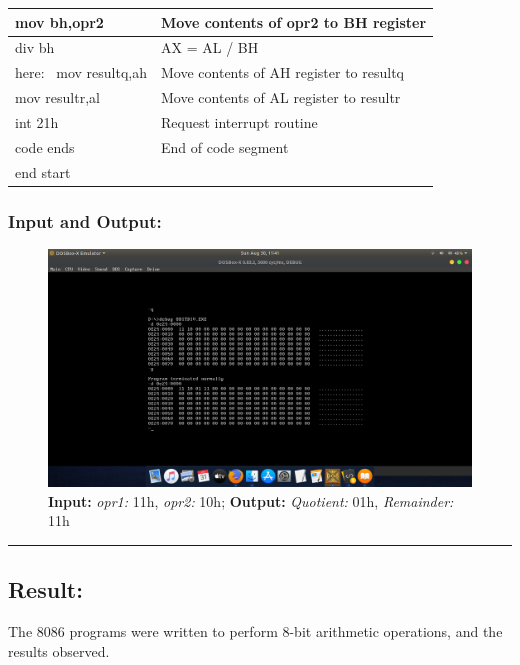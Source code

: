 \documentclass[12pt,a4paper]{article}
\begin{document}
\begin{flushleft}
\begin{table}[h]
{\begin{tabular}{|l|l|}
\hline
mov bh,opr2                                                      & Move contents of opr2 to BH register          \\ 
\hline
div bh                                                           & AX = AL / BH                                  \\ 
\hline
here:~ mov resultq,ah                                            & Move contents of AH register to resultq       \\ 
\hline
mov resultr,al                                                   & Move contents of AL register to resultr       \\ 
\hline
int 21h                                                          & Request interrupt routine                     \\ 
\hline
code ends                                                        & End of code segment                           \\
\hline
end start                                                        &                                               \\
\hline
\end{tabular}
}
\end{table}

\newpage
\subsubsection*{\textbf{Input and Output:}}
\begin{figure}[h]
    \centering
    \includegraphics[trim = 100mm 70mm 100mm 80mm, clip, width = \textwidth]{Pics/Division.png}
    \caption{ \textbf{Input:} \emph{opr1:} 11h, \emph{opr2:} 10h; 
              \textbf{Output:} \emph{Quotient:} 01h, \emph{Remainder:} 11h}
\end{figure}

\hrule
\subsection*{\textbf{Result:}}
The 8086 programs were written to perform 8-bit arithmetic operations, and the results observed.
\end{flushleft}
\end{document}
